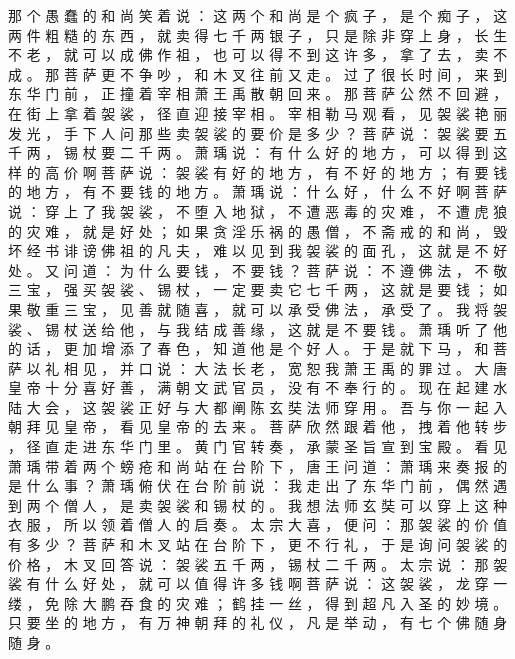 {那 个 愚 蠢 的 和 尚 笑 着 说 ： 这 两 个 和 尚 是 个 疯 子 ， 是 个 痴 子 ， 这 两 件 粗 糙 的 东 西 ， 就 卖 得 七 千 两 银 子 ， 只 是 除 非 穿 上 身 ， 长 生 不 老 ， 就 可 以 成 佛 作 祖 ， 也 可 以 得 不 到 这 许 多 ， 拿 了 去 ， 卖 不 成 。 那 菩 萨 更 不 争 吵 ， 和 木 叉 往 前 又 走 。
过 了 很 长 时 间 ， 来 到 东 华 门 前 ， 正 撞 着 宰 相 萧 王 禹 散 朝 回 来 。
那 菩 萨 公 然 不 回 避 ， 在 街 上 拿 着 袈 裟 ， 径 直 迎 接 宰 相 。
宰 相 勒 马 观 看 ， 见 袈 裟 艳 丽 发 光 ， 手 下 人 问 那 些 卖 袈 裟 的 要 价 是 多 少 ？ 菩 萨 说 ： 袈 裟 要 五 千 两 ， 锡 杖 要 二 千 两 。
萧 瑀 说 ： 有 什 么 好 的 地 方 ， 可 以 得 到 这 样 的 高 价 啊 菩 萨 说 ： 袈 裟 有 好 的 地 方 ， 有 不 好 的 地 方 ； 有 要 钱 的 地 方 ， 有 不 要 钱 的 地 方 。
萧 瑀 说 ： 什 么 好 ， 什 么 不 好 啊 菩 萨 说 ： 穿 上 了 我 袈 裟 ， 不 堕 入 地 狱 ， 不 遭 恶 毒 的 灾 难 ， 不 遭 虎 狼 的 灾 难 ， 就 是 好 处 ； 如 果 贪 淫 乐 祸 的 愚 僧 ， 不 斋 戒 的 和 尚 ， 毁 坏 经 书 诽 谤 佛 祖 的 凡 夫 ， 难 以 见 到 我 袈 裟 的 面 孔 ， 这 就 是 不 好 处 。
又 问 道 ： 为 什 么 要 钱 ， 不 要 钱 ？ 菩 萨 说 ： 不 遵 佛 法 ， 不 敬 三 宝 ， 强 买 袈 裟 、 锡 杖 ， 一 定 要 卖 它 七 千 两 ， 这 就 是 要 钱 ； 如 果 敬 重 三 宝 ， 见 善 就 随 喜 ， 就 可 以 承 受 佛 法 ， 承 受 了 。 我 将 袈 裟 、 锡 杖 送 给 他 ， 与 我 结 成 善 缘 ， 这 就 是 不 要 钱 。
萧 瑀 听 了 他 的 话 ， 更 加 增 添 了 春 色 ， 知 道 他 是 个 好 人 。
于 是 就 下 马 ， 和 菩 萨 以 礼 相 见 ， 并 口 说 ： 大 法 长 老 ， 宽 恕 我 萧 王 禹 的 罪 过 。
大 唐 皇 帝 十 分 喜 好 善 ， 满 朝 文 武 官 员 ， 没 有 不 奉 行 的 。
现 在 起 建 水 陆 大 会 ， 这 袈 裟 正 好 与 大 都 阐 陈 玄 奘 法 师 穿 用 。
吾 与 你 一 起 入 朝 拜 见 皇 帝 ， 看 见 皇 帝 的 去 来 。
菩 萨 欣 然 跟 着 他 ， 拽 着 他 转 步 ， 径 直 走 进 东 华 门 里 。
黄 门 官 转 奏 ， 承 蒙 圣 旨 宣 到 宝 殿 。
看 见 萧 瑀 带 着 两 个 螃 疮 和 尚 站 在 台 阶 下 ， 唐 王 问 道 ： 萧 瑀 来 奏 报 的 是 什 么 事 ？ 萧 瑀 俯 伏 在 台 阶 前 说 ： 我 走 出 了 东 华 门 前 ， 偶 然 遇 到 两 个 僧 人 ， 是 卖 袈 裟 和 锡 杖 的 。
我 想 法 师 玄 奘 可 以 穿 上 这 种 衣 服 ， 所 以 领 着 僧 人 的 启 奏 。
太 宗 大 喜 ， 便 问 ： 那 袈 裟 的 价 值 有 多 少 ？
菩 萨 和 木 叉 站 在 台 阶 下 ， 更 不 行 礼 ， 于 是 询 问 袈 裟 的 价 格 ， 木 叉 回 答 说 ： 袈 裟 五 千 两 ， 锡 杖 二 千 两 。
太 宗 说 ： 那 袈 裟 有 什 么 好 处 ， 就 可 以 值 得 许 多 钱 啊 菩 萨 说 ： 这 袈 裟 ， 龙 穿 一 缕 ， 免 除 大 鹏 吞 食 的 灾 难 ； 鹤 挂 一 丝 ， 得 到 超 凡 入 圣 的 妙 境 。
只 要 坐 的 地 方 ， 有 万 神 朝 拜 的 礼 仪 ， 凡 是 举 动 ， 有 七 个 佛 随 身 随 身 。
}
